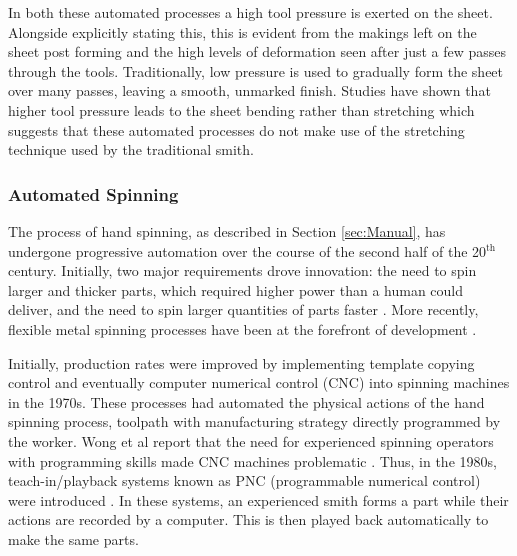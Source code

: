 In both these automated processes a high tool pressure is exerted on the sheet. Alongside explicitly stating this, this is evident from the makings left on the sheet post forming and the high levels of deformation seen after just a few passes through the tools. Traditionally, low pressure is used to gradually form the sheet over many passes, leaving a smooth, unmarked finish. Studies have shown that higher tool pressure leads to the sheet bending rather than stretching \citep{Bowen2021NumericalProcess} which suggests that these automated processes do not make use of the stretching technique used by the traditional smith.


\subsubsection{Automated Spinning} \label{sec:MechSpinning}

The process of hand spinning, as described in Section \ref{sec:Manual}, has undergone progressive automation over the course of the second half of the 20$^{\text{th}}$ century. Initially, two major requirements drove innovation: the need to spin larger and thicker parts, which required higher power than a human could deliver, and the need to spin larger quantities of parts faster \citep{Wong2003AProcesses}. More recently, flexible metal spinning processes have been at the forefront of development \citep{TheUseLessGroupFlexibleSpinning}.


Initially, production rates were improved by implementing template copying control and eventually computer numerical control (CNC) into spinning machines in the 1970s. These processes had automated the physical actions of the hand spinning process, toolpath with manufacturing strategy directly programmed by the worker. Wong et al report that the need for experienced spinning operators with programming skills made CNC machines problematic \citep{Wong2003AProcesses}. Thus, in the 1980s, teach-in/playback systems known as PNC (programmable numerical control) were introduced \citep{Lloyd1986AnProspective}. In these systems, an experienced smith forms a part while their actions are recorded by a computer. This is then played back automatically to make the same parts. %

